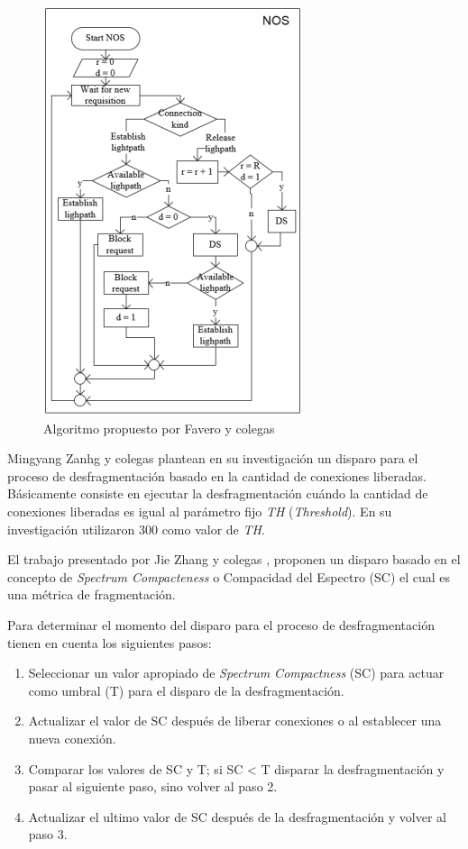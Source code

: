 \begin{figure}[h!]
    \centering
    \includegraphics{capitulos/img/disparoFavero}
    \caption{Algoritmo propuesto por Favero y colegas \cite{favero2015new}}
    \label{fig:favero}
\end{figure}

Mingyang Zanhg y colegas plantean en su investigación \cite{zhang2013bandwidth} un disparo para el proceso de desfragmentación basado en la cantidad de conexiones liberadas. Básicamente consiste en ejecutar la desfragmentación cuándo la cantidad de conexiones liberadas es igual al parámetro fijo \textit{TH} (\textit{Threshold}). En su investigación utilizaron 300 como valor de \textit{TH}.

El trabajo presentado por Jie Zhang y colegas \cite{zhang2012priority}, proponen un disparo basado en el concepto de \textit{Spectrum Compacteness} o Compacidad del Espectro (SC) el cual es una métrica de fragmentación.

Para determinar el momento del disparo para el proceso de desfragmentación tienen en cuenta los siguientes pasos:  
\begin{enumerate}[label=\arabic*)]
    \item Seleccionar un valor apropiado de \textit{Spectrum Compactness} (SC) para actuar como umbral (T) para el disparo de la desfragmentación.
    \item Actualizar el valor de SC después de liberar conexiones o al establecer una nueva conexión. 
    \item Comparar los valores de SC y T; si SC < T disparar la desfragmentación y pasar al siguiente paso, sino volver al paso 2.
    \item Actualizar el ultimo valor de SC después de la desfragmentación y volver al paso 3.
\end{enumerate}


